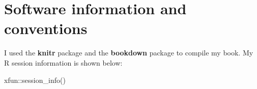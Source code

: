 \documentclass[
]{krantz}
\makeatletter
\newenvironment{Shaded}{\begin{snugshade}}{\end{snugshade}}
\newcommand{\FunctionTok}[1]{\textcolor[rgb]{0,0,0}{#1}}
\newcommand{\NormalTok}[1]{#1}
\newcommand{\SpecialCharTok}[1]{\textcolor[rgb]{0,0,0}{#1}}
\newenvironment{kframe}{%
\medskip{}
\setlength{\fboxsep}{.8em}
 \def\at@end@of@kframe{}%
 \ifinner\ifhmode%
  \def\at@end@of@kframe{\end{minipage}}%
  \begin{minipage}{\columnwidth}%
 \fi\fi%
 \def\FrameCommand##1{\hskip\@totalleftmargin \hskip-\fboxsep
 \colorbox{shadecolor}{##1}\hskip-\fboxsep
     \hskip-\linewidth \hskip-\@totalleftmargin \hskip\columnwidth}%
 \MakeFramed {\advance\hsize-\width
   \@totalleftmargin\z@ \linewidth\hsize
   \@setminipage}}%
 {\par\unskip\endMakeFramed%
 \at@end@of@kframe}
\renewenvironment{Shaded}{\begin{kframe}}{\end{kframe}}
\makeatother
\begin{document}
\hypertarget{software-information-and-conventions}{%
\section*{Software information and conventions}\label{software-information-and-conventions}}


I used the \textbf{knitr} package \citep{xie2015} and the \textbf{bookdown} package \citep{R-bookdown} to compile my book. My R session information is shown below:

\begin{Shaded}
\begin{Highlighting}[]
\NormalTok{xfun}\SpecialCharTok{::}\FunctionTok{session\_info}\NormalTok{()}
\end{Highlighting}
\end{Shaded}
\end{document}
